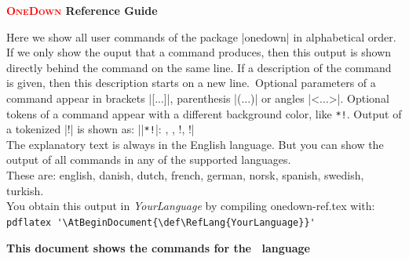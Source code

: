 \documentclass[a4paper,fontsize=11pt,%
  danish,%
  dutch,%
  french,%
  german,%
  norsk,%
  spanish,%
  swedish,%
  turkish,%
  english,%
]{scrartcl}
\newcommand\OneDown{\textcolor{red}{\smaller\bfseries\textsc{OneDown}}\xspace}
\newcommand\Oarg[1]{\colorbox{optbackgr}{\texttt{#1}}}
\def\RefLang{english}
\begin{document}
%
\expandafter\selectlanguage\expandafter{\RefLang}
%
\larger
{}
\pagestyle{empty}
\centerline{\larger\larger\textbf{\OneDown Reference Guide}}
\par\vspace{1\baselineskip}\noindent
Here we show all user commands of the package |onedown| in alphabetical
order. If we only show the ouput that a command produces, then this output
is shown directly behind the command on the same line. If a description of
the command is given, then this description starts on a new line. Optional
parameters of a command appear in brackets |[...]|, parenthesis |(...)| or
angles |<...>|. Optional tokens of a command appear with a different
background color, like \Oarg{*!}. Output of a tokenized |\macro*!| is shown
as:
\quad|\macro|\Oarg{*!}|: \macro, \macro*, \macro!, \macro*!|\\
The explanatory text is always in the English language. But you can show the output of all commands
in any of the supported languages.\\
These are: english, danish, dutch, french, german, norsk, spanish, swedish, turkish. \\
You obtain this output in \emph{YourLanguage} by compiling onedown-ref.tex with: \\[0.5em]
%
\verb|pdflatex '\AtBeginDocument{\def\RefLang{YourLanguage}}'|
\\[0.7em]
\centerline{\textbf{This document shows the commands for the \emph{\languagename}\ language}}
\end{document}
